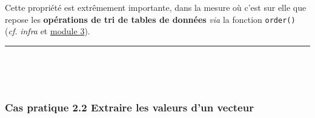 \documentclass[12pt,twosided, notitlepage]{book}
\begin{document}
Cette propriété est extrêmement importante, dans la mesure où c'est sur
elle que repose les \textbf{opérations de tri de tables de données}
\emph{via} la fonction \texttt{order()} (\emph{cf.} \emph{infra} et
\underline{module 3}).

\begin{center}\rule{0.5\linewidth}{\linethickness}\end{center}

~

~

\subsubsection{\texorpdfstring{\textbf{Cas pratique 2.2} Extraire les
valeurs d'un
vecteur}{Cas pratique 2.2 Extraire les valeurs d'un vecteur}}\label{cas-pratique-2.2-extraire-les-valeurs-dun-vecteur}

\end{document}
